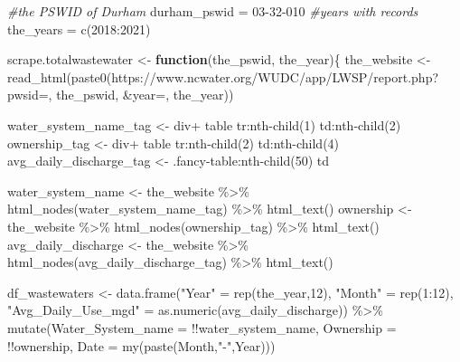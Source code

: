 \documentclass[
  12pt,
]{article}
\newenvironment{Shaded}{\begin{snugshade}}{\end{snugshade}}
\newcommand{\AttributeTok}[1]{\textcolor[rgb]{0.77,0.63,0.00}{#1}}
\newcommand{\CommentTok}[1]{\textcolor[rgb]{0.56,0.35,0.01}{\textit{#1}}}
\newcommand{\ControlFlowTok}[1]{\textcolor[rgb]{0.13,0.29,0.53}{\textbf{#1}}}
\newcommand{\DecValTok}[1]{\textcolor[rgb]{0.00,0.00,0.81}{#1}}
\newcommand{\FunctionTok}[1]{\textcolor[rgb]{0.00,0.00,0.00}{#1}}
\newcommand{\NormalTok}[1]{#1}
\newcommand{\OtherTok}[1]{\textcolor[rgb]{0.56,0.35,0.01}{#1}}
\newcommand{\SpecialCharTok}[1]{\textcolor[rgb]{0.00,0.00,0.00}{#1}}
\newcommand{\StringTok}[1]{\textcolor[rgb]{0.31,0.60,0.02}{#1}}
\begin{document}
\begin{Shaded}
\begin{Highlighting}[]
\CommentTok{\#the PSWID of Durham}
\NormalTok{durham\_pswid }\OtherTok{=} \StringTok{\textquotesingle{}03{-}32{-}010\textquotesingle{}}
\CommentTok{\#years with records}
\NormalTok{the\_years }\OtherTok{=} \FunctionTok{c}\NormalTok{(}\DecValTok{2018}\SpecialCharTok{:}\DecValTok{2021}\NormalTok{)}

\NormalTok{scrape.totalwastewater }\OtherTok{\textless{}{-}} \ControlFlowTok{function}\NormalTok{(the\_pswid, the\_year)\{}
\NormalTok{  the\_website }\OtherTok{\textless{}{-}} \FunctionTok{read\_html}\NormalTok{(}\FunctionTok{paste0}\NormalTok{(}\StringTok{\textquotesingle{}https://www.ncwater.org/WUDC/app/LWSP/report.php?pwsid=\textquotesingle{}}\NormalTok{, }
\NormalTok{                                  the\_pswid, }\StringTok{\textquotesingle{}\&year=\textquotesingle{}}\NormalTok{, the\_year))}
  
\NormalTok{  water\_system\_name\_tag }\OtherTok{\textless{}{-}} \StringTok{\textquotesingle{}div+ table tr:nth{-}child(1) td:nth{-}child(2)\textquotesingle{}}
\NormalTok{  ownership\_tag }\OtherTok{\textless{}{-}} \StringTok{\textquotesingle{}div+ table tr:nth{-}child(2) td:nth{-}child(4)\textquotesingle{}}
\NormalTok{  avg\_daily\_discharge\_tag }\OtherTok{\textless{}{-}} \StringTok{\textquotesingle{}.fancy{-}table:nth{-}child(50) td\textquotesingle{}}
  
\NormalTok{  water\_system\_name }\OtherTok{\textless{}{-}}\NormalTok{ the\_website }\SpecialCharTok{\%\textgreater{}\%} \FunctionTok{html\_nodes}\NormalTok{(water\_system\_name\_tag) }\SpecialCharTok{\%\textgreater{}\%} \FunctionTok{html\_text}\NormalTok{()}
\NormalTok{  ownership }\OtherTok{\textless{}{-}}\NormalTok{ the\_website }\SpecialCharTok{\%\textgreater{}\%}   \FunctionTok{html\_nodes}\NormalTok{(ownership\_tag) }\SpecialCharTok{\%\textgreater{}\%}  \FunctionTok{html\_text}\NormalTok{()}
\NormalTok{  avg\_daily\_discharge }\OtherTok{\textless{}{-}}\NormalTok{ the\_website }\SpecialCharTok{\%\textgreater{}\%} \FunctionTok{html\_nodes}\NormalTok{(avg\_daily\_discharge\_tag) }\SpecialCharTok{\%\textgreater{}\%} \FunctionTok{html\_text}\NormalTok{()}
  
\NormalTok{  df\_wastewaters }\OtherTok{\textless{}{-}} \FunctionTok{data.frame}\NormalTok{(}\StringTok{"Year"} \OtherTok{=} \FunctionTok{rep}\NormalTok{(the\_year,}\DecValTok{12}\NormalTok{),}
                               \StringTok{"Month"} \OtherTok{=} \FunctionTok{rep}\NormalTok{(}\DecValTok{1}\SpecialCharTok{:}\DecValTok{12}\NormalTok{),}
                               \StringTok{"Avg\_Daily\_Use\_mgd"} \OtherTok{=} \FunctionTok{as.numeric}\NormalTok{(avg\_daily\_discharge)) }\SpecialCharTok{\%\textgreater{}\%} 
    \FunctionTok{mutate}\NormalTok{(}\AttributeTok{Water\_System\_name =} \SpecialCharTok{!!}\NormalTok{water\_system\_name,}
         \AttributeTok{Ownership =} \SpecialCharTok{!!}\NormalTok{ownership,}
         \AttributeTok{Date =} \FunctionTok{my}\NormalTok{(}\FunctionTok{paste}\NormalTok{(Month,}\StringTok{"{-}"}\NormalTok{,Year)))}
  

\end{Highlighting}
\end{Shaded}
\end{document}
